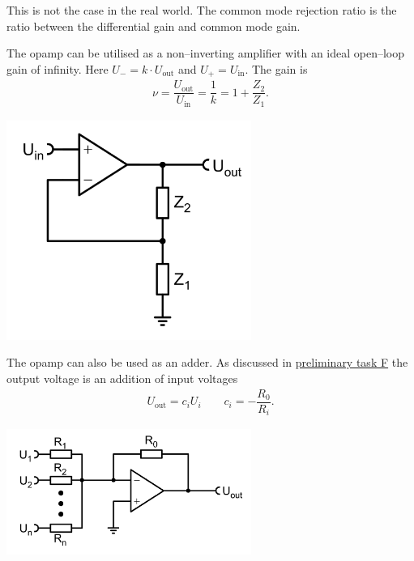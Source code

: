 \documentclass[a4paper,10pt]{article}
\newenvironment{Figure}
        {\par\medskip\noindent\minipage{\linewidth}}
        {\endminipage\par\medskip}
\numberwithin{equation}{section}
\begin{document}
\begin{multicols}{2}
\begin{enumerate}[label=--]
                        This is not the case in the real world.
                        The common mode rejection ratio is the ratio between the differential gain and common mode gain.
        \end{enumerate}
        The opamp can be utilised as a non--inverting amplifier with an ideal open--loop gain of infinity.
        Here $U_-=k\cdot U_\text{out}$ and $U_+=U_\text{in}$.
        The gain is
        \begin{align} 
                \nu =\dfrac{U_\text{out}}{U_\text{in}}=\dfrac{1}{k}=1+\dfrac{Z_2}{Z_1}
        .\end{align} 
        \begin{Figure}
                \centering
                \includegraphics[width=0.6\textwidth]{noninverting_amp.png}
        \end{Figure}
        \noindent The opamp can also be used as an adder.
        As discussed in \hyperref[pre:F]{preliminary task F} the output voltage is an addition of input voltages
        \begin{align} 
                U_\text{out}=c_iU_i\qquad c_i=-\dfrac{R_0}{R_i}
        .\end{align} 
        \begin{Figure}
                \centering
                \includegraphics[width=0.6\textwidth]{adder.png}

\end{Figure}
\end{multicols}
\end{document}
